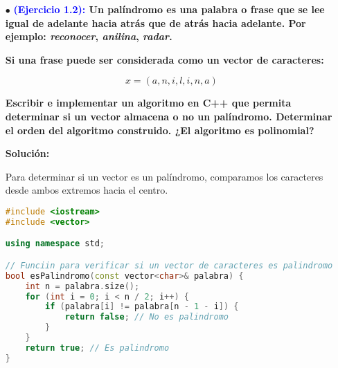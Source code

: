 \documentclass[12pt]{article}
\begin{document}
{\begin{enumerate}
{            Dado que cada variable puede tomar \textbf{2 valores} (Verdadero $V$ o Falso $F$), lo que equivale a \textbf{1 bit por variable}, y para almacenar cada literal debemos indicar si está negado ($\neg x_i$), usamos \textbf{1 bit adicional por literal}.
            
            La longitud de codificación se calcula como:
            
                \[
                    L = n + \sum_{i=1}^{m} m_i
                \]
            
            Sustituyendo los valores:
            
                \[
                    L = 5 + 10 = 15 \text{ bits}
                \]
            
            \textbf{Por lo tanto, la longitud de codificación de esta instancia del problema SAT es 15 bits.}
        }
        
        \item[$\bullet$]\textbf{\textcolor{blue}{(Ejercicio 1.2): } Un palíndromo es una palabra o frase que se lee igual de adelante hacia atrás que de atrás hacia adelante.  
        Por ejemplo: \textit{reconocer}, \textit{anilina}, \textit{radar}.}
        
        \textbf{Si una frase puede ser considerada como un vector de caracteres:}  
        
            \[
                x = (a, n, i, l, i, n, a)
            \]
        
        \textbf{Escribir e implementar un \textbf{algoritmo en C++} que permita determinar si un vector almacena o no un palíndromo.  
        Determinar el orden del algoritmo construido. ¿El algoritmo es polinomial?}
        
        \textbf{Solución: }
        
        {
            Para determinar si un vector es un palíndromo, comparamos los caracteres desde ambos extremos hacia el centro.

            \begin{lstlisting}[language=C++]
#include <iostream>
#include <vector>

using namespace std;

// Funciin para verificar si un vector de caracteres es palindromo
bool esPalindromo(const vector<char>& palabra) {
    int n = palabra.size();
    for (int i = 0; i < n / 2; i++) {
        if (palabra[i] != palabra[n - 1 - i]) {
            return false; // No es palindromo
        }
    }
    return true; // Es palindromo
}


\end{lstlisting}}
\end{enumerate}}
\end{document}
